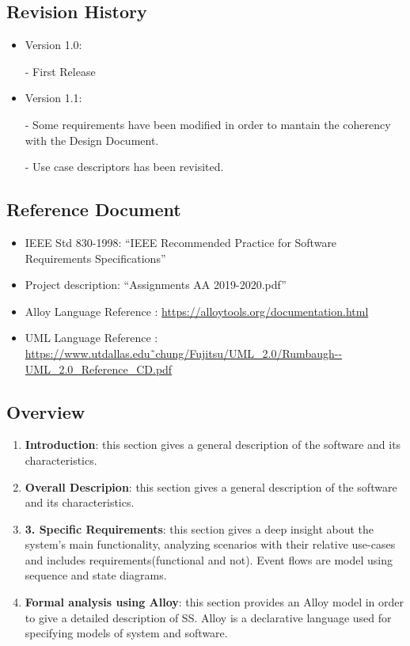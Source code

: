 \documentclass[12pt]{article}
\begin{document}
\subsection{Revision History}
\vspace{2mm}
\begin{itemize}
\item Version 1.0:

- First Release

\item Version 1.1:

- Some requirements have been modified in order to mantain the coherency with the Design Document.

- Use case descriptors has been revisited.
\end{itemize}

\vspace{2mm}
\subsection{Reference Document}
\vspace{2mm}
\begin{itemize}
\item IEEE Std 830-1998: “IEEE Recommended Practice for Software Requirements Specifications”

\item Project description: “Assignments AA 2019-2020.pdf”
\item Alloy Language Reference : \url{https://alloytools.org/documentation.html}
\item UML Language Reference : \url{https://www.utdallas.edu˜chung/Fujitsu/UML_2.0/Rumbaugh--UML_2.0_Reference_CD.pdf}
\end{itemize}

\subsection{Overview}
\vspace{2mm}
\begin{enumerate}
\item \textbf{Introduction}: this section gives a general description of the software  and its characteristics.

\item \textbf{Overall Descripion}: this section gives a general description of the software  and its characteristics.

\item \textbf{3.	Specific Requirements}: this section gives a deep insight about the system’s main functionality, analyzing scenarios with their relative use-cases and includes requirements(functional and not). Event flows are model using sequence and state diagrams. 

\item \textbf{Formal analysis using Alloy}: this section provides an Alloy model in order to give a detailed description of SS. Alloy is a declarative language used for specifying models of system and software.


\end{enumerate}
\end{document}
